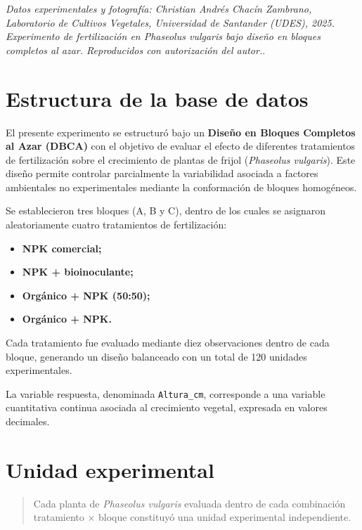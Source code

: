 \documentclass[
  spanish,
  letterpaper,
  DIV=11,
  numbers=noendperiod]{scrreprt}
\begin{document}
\emph{Datos experimentales y fotografía: Christian Andrés Chacín
Zambrano, Laboratorio de Cultivos Vegetales, Universidad de Santander
(UDES), 2025. Experimento de fertilización en Phaseolus vulgaris bajo
diseño en bloques completos al azar. Reproducidos con autorización del
autor.}.

\section{Estructura de la base de
datos}\label{estructura-de-la-base-de-datos-1}

El presente experimento se estructuró bajo un \textbf{Diseño en Bloques
Completos al Azar (DBCA)} con el objetivo de evaluar el efecto de
diferentes tratamientos de fertilización sobre el crecimiento de plantas
de frijol (\emph{Phaseolus vulgaris}). Este diseño permite controlar
parcialmente la variabilidad asociada a factores ambientales no
experimentales mediante la conformación de bloques homogéneos.

Se establecieron tres bloques (A, B y C), dentro de los cuales se
asignaron aleatoriamente cuatro tratamientos de fertilización:

\begin{itemize}
\item
  \textbf{NPK comercial;}
\item
  \textbf{NPK + bioinoculante;}
\item
  \textbf{Orgánico + NPK (50:50);}
\item
  \textbf{Orgánico + NPK.}
\end{itemize}

Cada tratamiento fue evaluado mediante diez observaciones dentro de cada
bloque, generando un diseño balanceado con un total de 120 unidades
experimentales.

La variable respuesta, denominada \texttt{Altura\_cm}, corresponde a una
variable cuantitativa continua asociada al crecimiento vegetal,
expresada en valores decimales.

\section{Unidad experimental}\label{unidad-experimental}

\begin{quote}
Cada planta de \emph{Phaseolus vulgaris} evaluada dentro de cada
combinación tratamiento × bloque constituyó una unidad experimental
independiente.
\end{quote}
\end{document}
